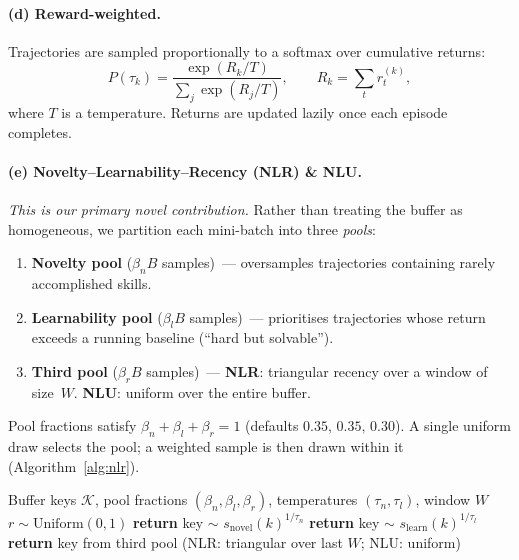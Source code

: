 \documentclass{article}
\begin{document}
\paragraph{(d) Reward-weighted.}
Trajectories are sampled proportionally to a softmax over cumulative
returns:
\begin{equation}
  P(\tau_k)
  =
  \frac{\exp(R_k/T)}
       {\sum_{j}\exp(R_j/T)},
  \qquad
  R_k = {\textstyle\sum_t} r_t^{(k)},
  \label{eq:reward_sel}
\end{equation}
where $T$ is a temperature.  Returns are updated lazily once each
episode completes.

\paragraph{(e) Novelty--Learnability--Recency (NLR) \& NLU.}
\emph{This is our primary novel contribution.}
Rather than treating the buffer as homogeneous, we partition each
mini-batch into three \emph{pools}:
\begin{enumerate}
\item \textbf{Novelty pool} ($\beta_n B$ samples)~---
  oversamples trajectories containing rarely accomplished skills.
\item \textbf{Learnability pool} ($\beta_l B$ samples)~---
  prioritises trajectories whose return exceeds a running baseline
  (``hard but solvable'').
\item \textbf{Third pool} ($\beta_r B$ samples)~---
  \textbf{NLR}: triangular recency over a window of size~$W$.\;
  \textbf{NLU}: uniform over the entire buffer.
\end{enumerate}
Pool fractions satisfy $\beta_n+\beta_l+\beta_r=1$
(defaults $0.35,\,0.35,\,0.30$).
A single uniform draw selects the pool; a weighted sample is then
drawn within it (Algorithm~\ref{alg:nlr}).

\begin{algorithm}[t]
\caption{NLR/NLU Replay Selector --- single item draw}
\label{alg:nlr}
\begin{algorithmic}[1]
\REQUIRE Buffer keys $\mathcal{K}$, pool fractions
  $(\beta_n,\beta_l,\beta_r)$, temperatures $(\tau_n,\tau_l)$,
  window $W$
\STATE $r \sim \mathrm{Uniform}(0,1)$
  \STATE \textbf{return} key $\sim$
    $s_{\mathrm{novel}}(k)^{1/\tau_n}$
  \STATE \textbf{return} key $\sim$
    $s_{\mathrm{learn}}(k)^{1/\tau_l}$
\ELSE
  \STATE \textbf{return} key from third pool
    {\small(NLR: triangular over last $W$;\; NLU: uniform)}
\ENDIF
\end{algorithmic}
\end{algorithm}
\end{document}
